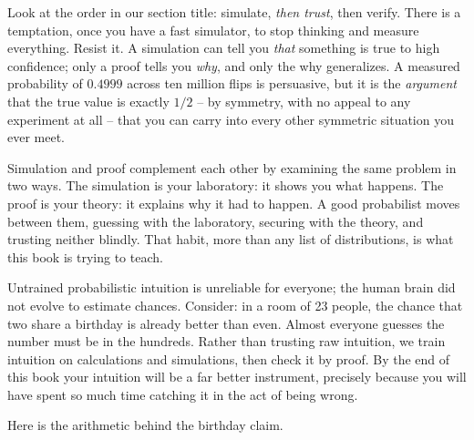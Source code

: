 Look at the order in our section title: simulate, \emph{then trust}, then
verify. There is a temptation, once you have a fast simulator, to stop
thinking and measure everything. Resist it. A simulation can tell you
\emph{that} something is true to high confidence; only a proof tells you
\emph{why}, and only the why generalizes. A measured probability of $0.4999$
across ten million flips is persuasive, but it is the \emph{argument} that the
true value is exactly $1/2$ -- by symmetry, with no appeal to any experiment at
all -- that you can carry into every other symmetric situation you ever meet.

\begin{happeningbox}
Simulation and proof complement each other by examining the same
problem in two ways. The simulation is your laboratory: it shows you what happens. The
proof is your theory: it explains why it had to happen. A good
probabilist moves between them, guessing with the laboratory, securing
with the theory, and trusting neither blindly. That habit, more than any list
of distributions, is what this book is trying to teach.
\end{happeningbox}

\begin{paradoxbox}
Untrained
probabilistic intuition is unreliable for everyone; the human brain did not
evolve to estimate chances. Consider: in a room
of 23 people, the chance that two share a birthday is already better than
even. Almost everyone guesses the number must be in the hundreds. Rather than
trusting raw intuition, we
train intuition on calculations and simulations, then check it by proof. By the end of this book your intuition will
be a far better instrument, precisely because you will have spent so much time
catching it in the act of being wrong.
\end{paradoxbox}

Here is the arithmetic behind the birthday claim.

